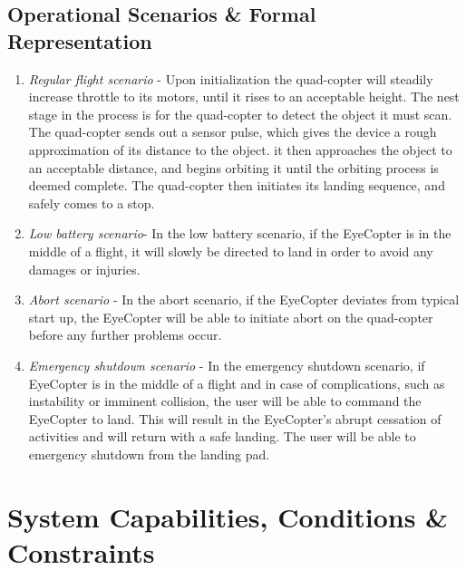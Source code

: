 \documentclass[10pt,letterpaper]{article}
\begin{document}
\subsection{Operational Scenarios \& Formal Representation}
\begin{enumerate}[label=\textbf{SR\arabic*}]
	\item \textit{Regular flight scenario} - Upon initialization the quad-copter will steadily increase throttle to its motors, until it rises to an acceptable height. The nest stage in the process is for the quad-copter to detect the object it must scan. The quad-copter sends out a sensor pulse, which gives the device a rough approximation of its distance to the object. it then approaches the object to an acceptable distance, and begins orbiting it until the orbiting process is deemed complete. The quad-copter then initiates its landing sequence, and safely comes to a stop.
    \item \textit{Low battery scenario}- In the low battery scenario, if the EyeCopter is in the middle of a flight, it will slowly be directed to land in order to avoid any damages or injuries.
    \item \textit{Abort scenario} - In the abort scenario, if the EyeCopter deviates from typical start up, the EyeCopter will be able to initiate abort on the quad-copter before any further problems occur.
    \item \textit{Emergency shutdown scenario} - In the emergency shutdown scenario, if EyeCopter is in the middle of a flight and in case of complications, such as instability or imminent collision, the user will be able to command the EyeCopter to land. This will result in the EyeCopter's abrupt cessation of activities and will return with a safe landing. The user will be able to emergency shutdown from the landing pad.  
\end{enumerate}


\newpage


\section{System Capabilities, Conditions \& Constraints}
\end{document}
